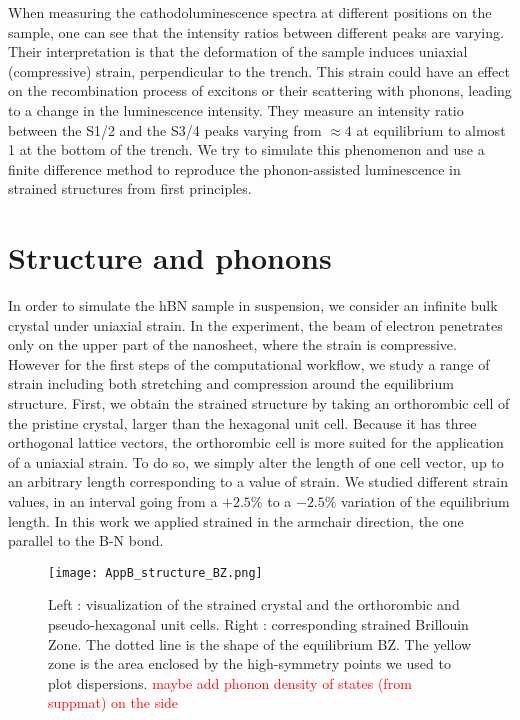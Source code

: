 When measuring the cathodoluminescence spectra at different positions on the sample, one can see that the intensity ratios between different peaks are varying. Their interpretation is that the deformation of the sample induces uniaxial (compressive) strain, perpendicular to the trench. This strain could have an effect on the recombination process of excitons or their scattering with phonons, leading to a change in the luminescence intensity. They measure an intensity ratio between the S1/2 and the S3/4 peaks varying from $\approx 4$ at equilibrium to almost 1 at the bottom of the trench. We try to simulate this phenomenon and use a finite difference method to reproduce the phonon-assisted luminescence in strained structures from first principles.

%
\section{Structure and phonons}
In order to simulate the hBN sample in suspension, we consider an infinite bulk crystal under uniaxial strain. In the experiment, the beam of electron penetrates only on the upper part of the nanosheet, where the strain is compressive. However for the first steps of the computational workflow, we study a range of strain including both stretching and compression around the equilibrium structure.
First, we obtain the strained structure by taking an orthorombic cell of the pristine crystal, larger than the hexagonal unit cell. Because it has three orthogonal lattice vectors, the orthorombic cell is more suited for the application of a uniaxial strain. To do so, we simply alter the length of one cell vector, up to an arbitrary length corresponding to a value of strain. We studied different strain values, in an interval going from a $+2.5\%$ to a $-2.5\%$ variation of the equilibrium length. In this work we applied strained in the armchair direction, the one parallel to the B-N bond. 
\begin{figure}[tbp]
	\vspace{0.5cm}
	\setcapindent{2em}
	\centering
	\texttt{[image: AppB\_structure\_BZ.png]}
	\caption{Left : visualization of the strained crystal and the orthorombic and pseudo-hexagonal unit cells. Right : corresponding strained Brillouin Zone. The dotted line is the shape of the equilibrium BZ. The yellow zone is the area enclosed by the high-symmetry points we used to plot dispersions. \textcolor{red}{maybe add phonon density of states (from suppmat) on the side}}
	\label{fig:strain_BZ}
\end{figure}
